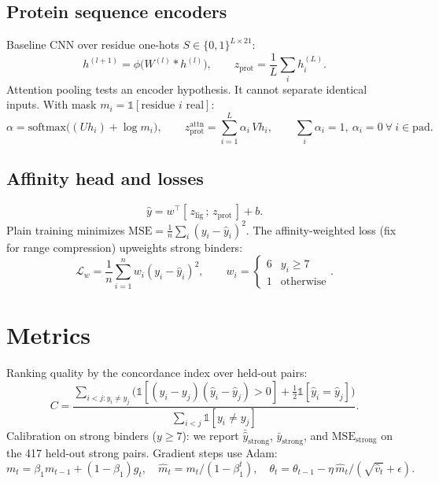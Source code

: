 \documentclass[11pt]{article}
\begin{document}
\subsection{Protein sequence encoders}
Baseline CNN over residue one-hots $S \in \{0,1\}^{L \times 21}$:
\begin{equation}
  h^{(l+1)} = \phi\!\big( W^{(l)} * h^{(l)} \big), \qquad
  z_{\mathrm{prot}} = \frac{1}{L}\sum_{i} h^{(L)}_i .
\end{equation}
Attention pooling tests an encoder hypothesis. It cannot separate identical inputs. With mask
$m_i = \mathbb{1}[\text{residue } i \text{ real}]$:
\begin{equation}
  \alpha = \mathrm{softmax}\!\big( (U h_i) + \log m_i \big), \qquad
  z_{\mathrm{prot}}^{\mathrm{attn}} = \sum_{i=1}^{L} \alpha_i\, V h_i,
  \qquad \sum_i \alpha_i = 1,\ \alpha_i = 0 \ \forall\ i \in \mathrm{pad}.
\end{equation}
\subsection{Affinity head and losses}
\begin{equation}
  \hat y = w^\top [\, z_{\mathrm{lig}} \,;\, z_{\mathrm{prot}} \,] + b .
\end{equation}
Plain training minimizes $\mathrm{MSE} = \frac{1}{n}\sum_i (y_i - \hat y_i)^2$.
The affinity-weighted loss (fix for range compression) upweights strong
binders:
\begin{equation}
  \mathcal{L}_w = \frac{1}{n}\sum_{i=1}^{n} w_i (y_i - \hat y_i)^2, \qquad
  w_i = \begin{cases} 6 & y_i \ge 7 \\ 1 & \text{otherwise} \end{cases} .
\end{equation}

\section{Metrics}
Ranking quality by the concordance index over held-out pairs:
\begin{equation}
  C = \frac{\sum_{i<j:y_i\ne y_j}
    \big(\mathbb{1}[(y_i-y_j)(\hat y_i-\hat y_j)>0]
    +\tfrac12\mathbb{1}[\hat y_i=\hat y_j]\big)}
    {\sum_{i<j}\mathbb{1}[y_i\ne y_j]} .
\end{equation}
Calibration on strong binders ($y \ge 7$): we report
$\bar{\hat y}_{\mathrm{strong}}$, $\bar y_{\mathrm{strong}}$, and
$\mathrm{MSE}_{\mathrm{strong}}$ on the 417 held-out strong pairs.
Gradient steps use Adam:
\begin{equation}
  m_t = \beta_1 m_{t-1} + (1-\beta_1) g_t, \quad
  \hat m_t = m_t / (1-\beta_1^t), \quad
  \theta_t = \theta_{t-1} - \eta\, \hat m_t / (\sqrt{\hat v_t} + \epsilon) .
\end{equation}
\end{document}
